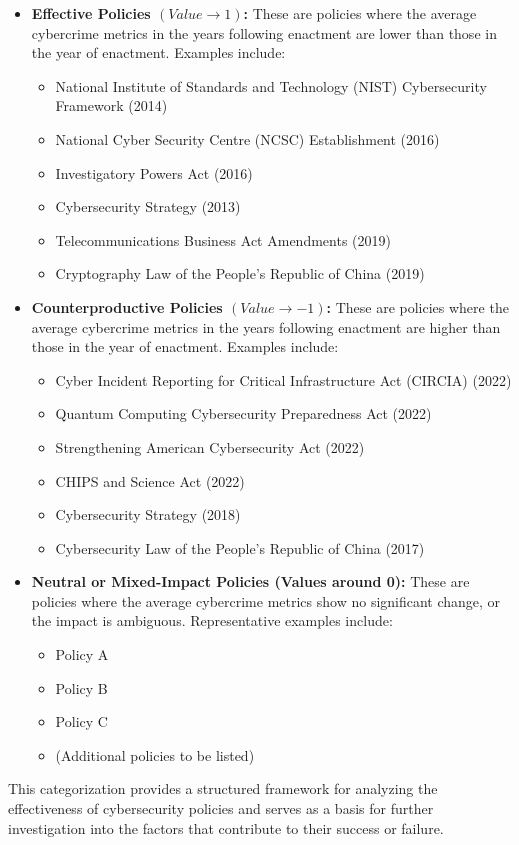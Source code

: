    \begin{itemize}
        \item \textbf{Effective Policies \( (Value \to 1) \):}
            These are policies where the average cybercrime metrics in the years following enactment
            are lower than those in the year of enactment.
            Examples include:
            \begin{itemize}
                \item National Institute of Standards and Technology (NIST) Cybersecurity Framework (2014)
                \item National Cyber Security Centre (NCSC) Establishment (2016)
                \item Investigatory Powers Act (2016)
                \item Cybersecurity Strategy (2013)
                \item Telecommunications Business Act Amendments (2019)
                \item Cryptography Law of the People’s Republic of China (2019)
            \end{itemize}

        \item \textbf{Counterproductive Policies \( (Value \to -1) \):}
            These are policies where the average cybercrime metrics in the years following enactment
            are higher than those in the year of enactment.
            Examples include:
            \begin{itemize}
                \item Cyber Incident Reporting for Critical Infrastructure Act (CIRCIA) (2022)
                \item Quantum Computing Cybersecurity Preparedness Act (2022)
                \item Strengthening American Cybersecurity Act (2022)
                \item CHIPS and Science Act (2022)
                \item Cybersecurity Strategy (2018)
                \item Cybersecurity Law of the People’s Republic of China (2017)
            \end{itemize}

        \item \textbf{Neutral or Mixed-Impact Policies (Values around 0):}
            These are policies where
            the average cybercrime metrics show no significant change, or the impact is ambiguous.
            Representative examples include:
            \begin{itemize}
                \item Policy A
                \item Policy B
                \item Policy C
                \item (Additional policies to be listed)
            \end{itemize}
    \end{itemize}

    This categorization provides a structured framework for analyzing the effectiveness of cybersecurity policies and
    serves as a basis for further investigation into the factors that contribute to their success or failure.

